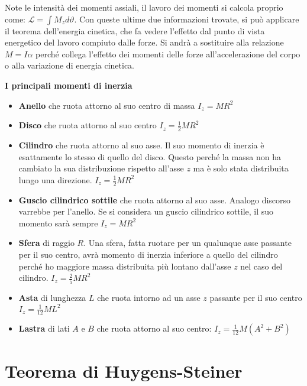Note le intensità dei momenti assiali, il lavoro dei momenti si calcola proprio come: $\mathcal{L} = \int M_z d\vartheta$. Con queste ultime due informazioni trovate, si può applicare il teorema dell'energia cinetica, che fa vedere l'effetto dal punto di vista energetico del lavoro compiuto dalle forze. Si andrà a sostituire alla relazione $M=I\alpha$ perché collega l'effetto dei momenti delle forze all'accelerazione del corpo o alla variazione di energia cinetica.

\textbf{I principali momenti di inerzia}

\begin{itemize}

	\item \textbf{Anello} che ruota attorno al suo centro di massa $\boxed{I_z = MR^2}$

	\item \textbf{Disco} che ruota attorno al suo centro $\boxed{I_z=\frac{1}{2} MR^2}$

	\item \textbf{Cilindro} che ruota attorno al suo asse. Il suo momento di inerzia è esattamente lo stesso di quello del disco. Questo perché la massa non ha cambiato la sua distribuzione rispetto all'asse $z$ ma è solo stata distribuita lungo una direzione. $\boxed{I_z = \frac{1}{2} MR^2}$

	\item \textbf{Guscio cilindrico sottile} che ruota attorno al suo asse. Analogo discorso varrebbe per l'anello. Se si considera un guscio cilindrico sottile, il suo momento sarà sempre $\boxed{I_z = MR^2}$

	\item \textbf{Sfera} di raggio $R$. Una sfera, fatta ruotare per un qualunque asse passante per il suo centro, avrà momento di inerzia inferiore a quello del cilindro perché ho maggiore massa distribuita più lontano dall'asse $z$ nel caso del cilindro. $\boxed{I_z = \frac{2}{5}MR^2}$

	\item \textbf{Asta} di lunghezza $L$ che ruota intorno ad un asse $z$ passante per il suo centro $\boxed{I_z = \frac{1}{12}ML^2}$

	\item \textbf{Lastra}  di lati $A$ e $B$ che ruota attorno al suo centro: $\boxed{I_z = \frac{1}{12}M(A^2+B^2)}$
\end{itemize}

\section{Teorema di Huygens-Steiner}

